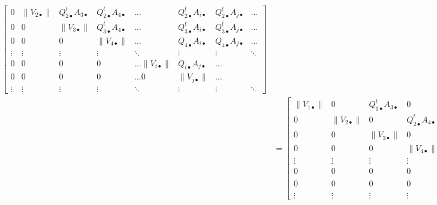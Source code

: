 \documentclass[a4paper,12pt, leqno, answers]{exam}
\newcommand{\mdot}{\bullet}
\begin{document}
\begin{questions}
\begin{solution}
\begin{align*}
\begin{bmatrix}
                0 & \| V_{2 \mdot} \| & Q_{2 \mdot}^t A_{3 \mdot} & Q_{2 \mdot}^t A_{4 \mdot} & \ldots & Q_{2 \mdot}^t A_{i \mdot} & Q_{2 \mdot}^t A_{j \mdot} & \ldots \\ 
                0 &  0 & \| V_{3 \mdot} \| & Q_{3 \mdot}^t A_{4 \mdot} & \ldots & Q_{3 \mdot}^t A_{i \mdot} & Q_{3 \mdot}^t A_{j \mdot} & \ldots \\ 
                0 &  0 & 0 & \| V_{4 \mdot} \| &  \ldots & Q_{4 \mdot} A_{i \mdot} & Q_{4 \mdot} A_{j \mdot} & \ldots \\ 
                \vdots & \vdots & \vdots & \vdots & \ddots & \vdots & \vdots & \ddots \\
                0 &  0 & 0 & 0 & \ldots \| V_{i \mdot} \| & Q_{i \mdot} A_{j \mdot} & \ldots \\
                0 &  0 & 0 & 0 & \ldots  0 & \| V_{j \mdot} \|  & \ldots \\
                \vdots & \vdots & \vdots & \vdots & \ddots & \vdots & \vdots & \ddots 
            \end{bmatrix} \\
            &= \begin{bmatrix}
                \| V_{1 \mdot} \| & 0 & Q_{1 \mdot}^t A_{3 \mdot} & 0 & \ldots & 0 & Q_{1 \mdot}^t A_{j \mdot} & \ldots \\  
                0 & \| V_{2 \mdot} \| & 0 & Q_{2 \mdot}^t A_{4 \mdot} & \ldots & Q_{2 \mdot}^t A_{i \mdot} & 0 & \ldots \\ 
                0 &  0 & \| V_{3 \mdot} \| & 0 & \ldots & 0 & Q_{3 \mdot}^t A_{j \mdot} & \ldots \\ 
                0 &  0 & 0 & \| V_{4 \mdot} \| &  \ldots & Q_{4 \mdot} A_{i \mdot} & 0 & \ldots \\ 
                \vdots & \vdots & \vdots & \vdots & \ddots & \vdots & \vdots & \ddots \\
                0 &  0 & 0 & 0 & \ldots \| V_{i \mdot} \| & 0 & \ldots \\
                0 &  0 & 0 & 0 & \ldots  0 & \| V_{j \mdot} \|  & \ldots \\
                \vdots & \vdots & \vdots & \vdots & \ddots & \vdots & \vdots & \ddots 
            \end{bmatrix}.
        \end{align*}
    \end{solution}
\end{questions}


\end{document}
